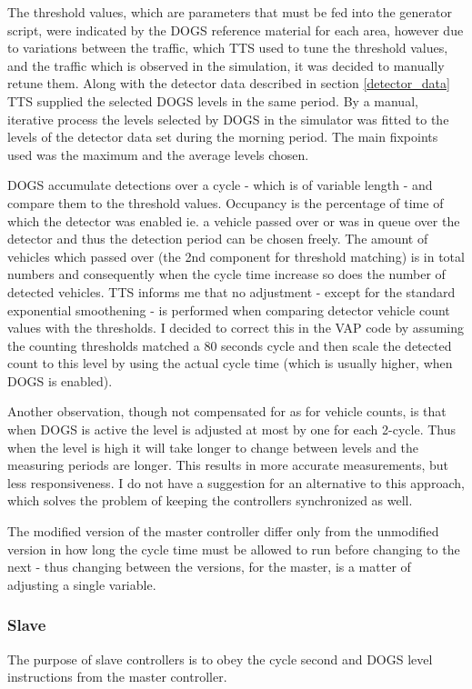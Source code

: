 The threshold values, which are parameters that must be fed into the generator script, were indicated by the DOGS reference material for each area, however due to variations between the traffic, which TTS used to tune the threshold values, and the traffic which is observed in the simulation, it was decided to manually retune them. 
Along with the detector data described in section \ref{detector_data} TTS supplied the selected DOGS levels in the same period. By a manual, iterative process the levels selected by DOGS in the simulator was fitted to the levels of the detector data set during the morning period. The main fixpoints used was the maximum and the average levels chosen.

DOGS accumulate detections over a cycle - which is of variable length - and compare them to the threshold values. Occupancy is the percentage of time of which the detector was enabled ie. a vehicle passed over or was in queue over the detector and thus the detection period can be chosen freely. The amount of vehicles which passed over (the 2nd component for threshold matching) is in total numbers and consequently when the cycle time increase so does the number of detected vehicles. TTS informs me that no adjustment - except for the standard exponential smoothening - is performed when comparing detector vehicle count values with the thresholds. I decided to correct this in the VAP code by assuming the counting thresholds matched a 80 seconds cycle and then scale the detected count to this level by using the actual cycle time (which is usually higher, when DOGS is enabled).

Another observation, though not compensated for as for vehicle counts, is that when DOGS is active the level is adjusted at most by one for each 2-cycle. Thus when the level is high it will take longer to change between levels and the measuring periods are longer. This results in more accurate measurements, but less responsiveness. I do not have a suggestion for an alternative to this approach, which solves the problem of keeping the controllers synchronized as well.

The modified version of the master controller differ only from the unmodified version in how long the cycle time must be allowed to run before changing to the next - thus changing between the versions, for the master, is a matter of adjusting a single variable.

\subsubsection{Slave}
The purpose of slave controllers is to obey the cycle second and DOGS level instructions from the master controller.

